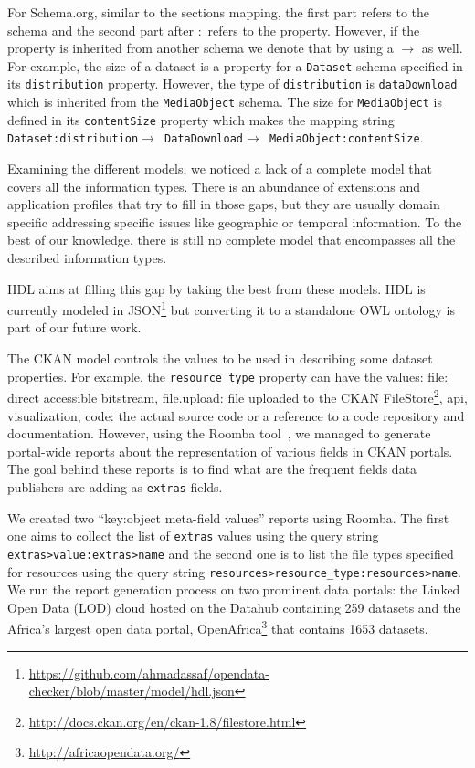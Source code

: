 \documentclass[runningheads,a4paper]{../../Tools/LaTEX/llncs}
\begin{document}
For Schema.org, similar to the sections mapping, the first part refers to the schema and the second part after $:$ refers to the property. However, if the property is inherited from another schema we denote that by using a $\rightarrow$ as well. For example, the size of a dataset is a property for a \texttt{Dataset} schema specified in its \texttt{distribution} property. However, the type of \texttt{distribution} is \texttt{dataDownload} which is inherited from the \texttt{MediaObject} schema. The size for \texttt{MediaObject} is defined in its \texttt{contentSize} property which makes the mapping string \texttt{Dataset:distribution$\rightarrow$ DataDownload$\rightarrow$ MediaObject:contentSize}.

Examining the different models, we noticed a lack of a complete model that covers all the information types. There is an abundance of extensions and application profiles that try to fill in those gaps, but they are usually domain specific addressing specific issues like geographic or temporal information. To the best of our knowledge, there is still no complete model that encompasses all the described information types.

HDL aims at filling this gap by taking the best from these models. HDL is currently modeled in JSON\footnote{\url{https://github.com/ahmadassaf/opendata-checker/blob/master/model/hdl.json}} but converting it to a standalone OWL ontology is part of our future work.

The CKAN model controls the values to be used in describing some dataset properties. For example, the \texttt{resource\_type} property can have the values: file: direct accessible bitstream, file.upload: file uploaded to the CKAN FileStore\footnote{\url{http://docs.ckan.org/en/ckan-1.8/filestore.html}}, api, visualization, code: the actual source code or a reference to a code repository and documentation. However, using the Roomba tool~\cite{Assaf:WWW:15}, we managed to generate portal-wide reports about the representation of various fields in CKAN portals. The goal behind these reports is to find what are the frequent fields data publishers are adding as \texttt{extras} fields.

We created two ``key:object meta-field values'' reports using Roomba. The first one aims to collect the list of \texttt{extras} values using the query string\\ \texttt{extras>value:extras>name} and the second one is to list the file types specified for resources using the query string \texttt{resources>resource\_type:resources>name}. We run the report generation process on two prominent data portals: the Linked Open Data (LOD) cloud hosted on the Datahub containing 259 datasets and the Africa's largest open data portal, OpenAfrica\footnote{\url{http://africaopendata.org/}} that contains 1653 datasets.
\end{document}

